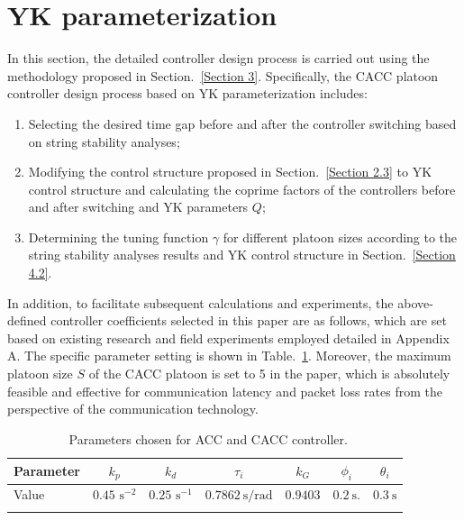 \documentclass[journal]{IEEEtran}
\begin{document}
\section{YK parameterization}
\label{Section 4}
In this section, the detailed controller design process is carried out using the methodology proposed in Section.~\ref{Section 3}. Specifically, the CACC platoon controller design process based on YK parameterization includes:
\begin{enumerate}
  \item Selecting the desired time gap before and after the controller switching based on string stability analyses;
  \item Modifying the control structure proposed in Section.~\ref{Section 2.3} to YK control structure and calculating the coprime factors of the controllers before and after switching and YK parameters $Q$;
  \item Determining the tuning function $\gamma$ for different platoon sizes according to the string stability analyses results and YK control structure in Section.~\ref{Section 4.2}.
\end{enumerate}

In addition, to facilitate subsequent calculations and experiments, the above-defined controller coefficients selected in this paper are as follows, which are set based on existing research \citep{navas2016using,milanes2014modeling,milanes2013cooperative} and field experiments employed detailed in Appendix A. The specific parameter setting is shown in Table.~\ref{table1}. Moreover, the maximum platoon size $S$ of the CACC platoon is set to 5 in the paper, which is absolutely feasible and effective for communication latency and packet loss rates from the perspective of the communication technology.
\begin{table}
  \centering

  \setlength{\abovecaptionskip}{0pt}
  \setlength{\belowcaptionskip}{10pt}%
  \caption{~Parameters chosen for ACC and CACC controller.}
  \resizebox{.95\columnwidth}{!}
  {\begin{tabular}{lcccccc} \toprule
      Parameter & $k_{p}$ & $k_{d}$ & $\tau_{i}$ & $k_{G}$ & $\phi_{i}$ & $\theta_{i}$ \\ \midrule Value & $0.45$ $ \mathrm{s}^{-2}$ & $0.25 $ $ \mathrm{s}^{-1}$ & $0.7862 \mathrm{~s} / \mathrm{rad}$ & $0.9403$ & $0.2 \mathrm{~s}.$ & $0.3 \mathrm{~s}$ \\ \bottomrule
      \label{table1}
    \end{tabular}}

\end{table}
\end{document}

